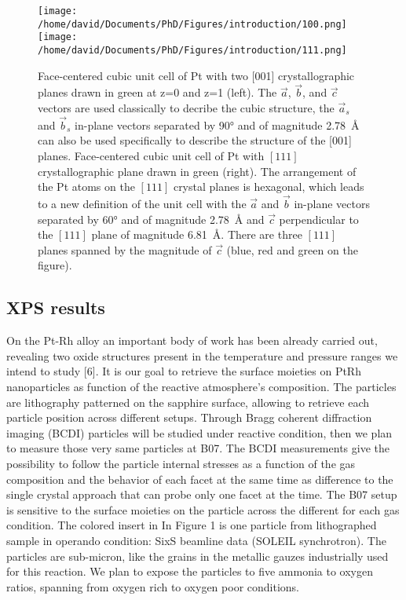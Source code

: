 \begin{figure}[!htb]
    \centering
    \texttt{[image: /home/david/Documents/PhD/Figures/introduction/100.png]}
    \texttt{[image: /home/david/Documents/PhD/Figures/introduction/111.png]}
    \caption{
        Face-centered cubic unit cell of Pt with two [001] crystallographic planes drawn in green at z=0 and z=1 (left).
        The $\vec{a}$, $\vec{b}$, and $\vec{c}$ vectors are used classically to decribe the cubic structure, the $\vec{a}_s$ and $\vec{b}_s$ in-plane vectors separated by \ang{90} and of magnitude \qty{2.78}{\angstrom} can also be used specifically to describe the structure of the [001] planes.
        Face-centered cubic unit cell of Pt with $[111]$ crystallographic plane drawn in green (right).
        The arrangement of the Pt atoms on the $[111]$ crystal planes is hexagonal, which leads to a new definition of the unit cell with the $\vec{a}$ and $\vec{b}$ in-plane vectors separated by \ang{60} and of magnitude \qty{2.78}{\angstrom} and $\vec{c}$ perpendicular to the $[111]$ plane of magnitude \qty{6.81}{\angstrom}.
        There are three $[111]$ planes spanned by the magnitude of $\vec{c}$ (blue, red and green on the figure).
    }
    \label{fig:Cubic100Hex111}
\end{figure}

\subsection{XPS results} \label{sec:XPS111}

On the Pt-Rh alloy an important body of work has been
already carried out, revealing two oxide structures present in the temperature and
pressure ranges we intend to study [6].
It is our goal to retrieve the surface moieties on PtRh nanoparticles as function of the reactive atmosphere’s composition.
The particles are lithography patterned on the sapphire surface, allowing to retrieve each particle position across different setups.
Through Bragg coherent diffraction imaging (BCDI) particles will be studied under reactive condition, then we plan to measure those very same particles at B07. The BCDI measurements give the possibility to follow the particle internal stresses as a function of the gas composition and the behavior of each facet at the same time as difference to the single crystal approach that can probe only one facet at the time.
The B07 setup is sensitive to the surface moieties on the particle across the different for each gas condition.
The colored insert in In Figure 1 is one particle from lithographed sample in operando condition: SixS beamline data (SOLEIL synchrotron).
The particles are sub-micron, like the grains in the metallic gauzes industrially used for this reaction. We plan to expose the particles to five ammonia to oxygen ratios, spanning from oxygen rich to oxygen poor conditions.

